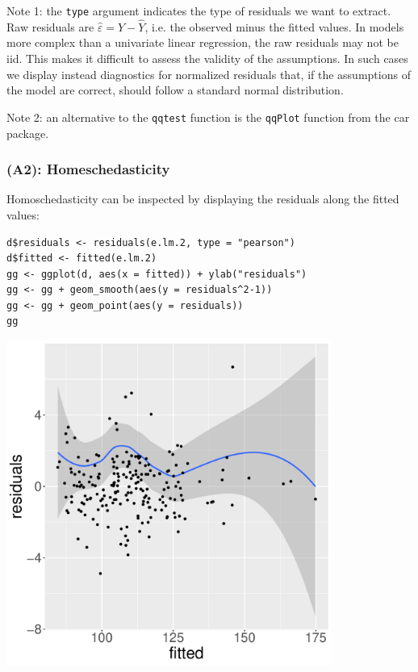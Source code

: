 \documentclass[12pt]{article}
\begin{document}
\bigskip

Note 1: the \texttt{type} argument indicates the type of residuals we want to
extract. Raw residuals are \(\hat{\varepsilon} = Y-\hat{Y}\), i.e. the
observed minus the fitted values. In models more complex than a
univariate linear regression, the raw residuals may not be iid. This
makes it difficult to assess the validity of the assumptions. In such
cases we display instead diagnostics for normalized residuals that, if
the assumptions of the model are correct, should follow a standard
normal distribution.

\bigskip

Note 2: an alternative to the \texttt{qqtest} function is the \texttt{qqPlot}
function from the car package.

\subsubsection{\textbf{(A2)}: Homeschedasticity}
\label{sec:orgbeedb2d}
Homoschedasticity can be inspected by displaying the residuals along
the fitted values:
\lstset{language=r,label= ,caption= ,captionpos=b,numbers=none}
\begin{lstlisting}
d$residuals <- residuals(e.lm.2, type = "pearson")
d$fitted <- fitted(e.lm.2)
gg <- ggplot(d, aes(x = fitted)) + ylab("residuals")
gg <- gg + geom_smooth(aes(y = residuals^2-1))
gg <- gg + geom_point(aes(y = residuals))
gg
\end{lstlisting}


\begin{center}
\includegraphics[width=0.8\textwidth]{./figures/A2-smooth.pdf}
\end{center}
\end{document}
